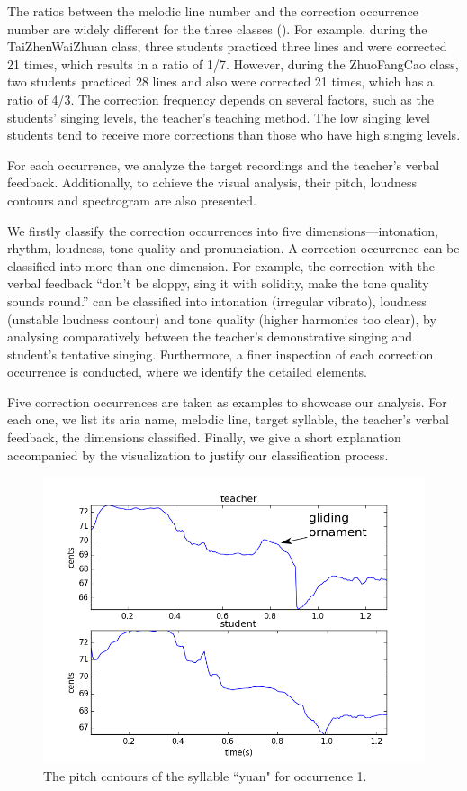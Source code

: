 The ratios between the melodic line number and the correction occurrence number are widely different for the three classes (). For example, during the TaiZhenWaiZhuan class, three students practiced three lines and were corrected 21 times, which results in a ratio of 1/7. However, during the ZhuoFangCao class, two students practiced 28 lines and also were corrected 21 times, which has a ratio of 4/3. The correction frequency depends on several factors, such as the students' singing levels, the teacher's teaching method. The low singing level students tend to receive more corrections than those who have high singing levels.

For each occurrence, we analyze the target recordings and the teacher's verbal feedback. Additionally, to achieve the visual analysis, their pitch, loudness contours and spectrogram are also presented.

We firstly classify the correction occurrences into five dimensions—intonation, rhythm, loudness, tone quality and pronunciation. A correction occurrence can be classified into more than one dimension. For example, the correction with the verbal feedback “don't be sloppy, sing it with solidity, make the tone quality sounds round.” can be classified into intonation (irregular vibrato), loudness (unstable loudness contour) and tone quality (higher harmonics too clear), by analysing comparatively between the teacher's demonstrative singing and student's tentative singing. Furthermore, a finer inspection of each correction occurrence is conducted, where we identify the detailed elements.

Five correction occurrences are taken as examples to showcase our analysis. For each one, we list its aria name, melodic line, target syllable, the teacher's verbal feedback, the dimensions classified. Finally, we give a short explanation accompanied by the visualization to justify our classification process.

\begin{figure}[ht!]
\includegraphics[width=\textwidth]{figs/spectro_vis/ch3_occ1.png}
\caption{The pitch contours of the syllable ``yuan" for occurrence 1.}
\label{fig:occurrence_1}
\end{figure}


